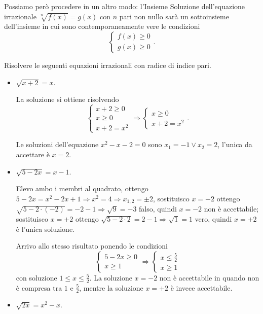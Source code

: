 Possiamo però procedere in un altro modo: l’Insieme Soluzione dell’equazione irrazionale $\sqrt[n]{f(x)}=g(x)$ con $ n $ pari non nullo sarà un sottoinsieme dell’insieme in cui sono contemporaneamente vere le condizioni 
\[\left\{\begin{array}{l}{f(x)\ge 0}\\{g(x)\ge 0}\end{array}\right..\]

\begin{exrig}
\begin{esempio}
Risolvere le seguenti equazioni irrazionali con radice di indice pari.
\begin{itemize}
\item $ \sqrt{x+2}=x $.

La soluzione si ottiene risolvendo 
\[\left\{\begin{array}{l}x+2\ge 0 \\x\ge 0\\x+2=x^2 \end{array}\right.\Rightarrow \left\{\begin{array}{l}x\ge 0\\x+2=x^2 \end{array}\right..\]

Le soluzioni dell'equazione $x^2-x-2=0$ sono $x_1=-1\vee x_2=2$, l'unica da accettare è $x=2$.

\item $ \sqrt{5-2x}=x-1 $.

Elevo ambo i membri al quadrato, ottengo $5-2x=x^2-2x+1 \Rightarrow x^2=4 \Rightarrow x_{1,2}=\pm 2$,
sostituisco $x=-2$ ottengo $\sqrt{5-2\cdot (-2)}=-2-1 \Rightarrow \sqrt 9=-3$ falso, quindi $x=-2$ non è accettabile;
sostituisco $x=+2$ ottengo $\sqrt{5-2\cdot 2}=2-1 \Rightarrow \sqrt 1=1$ vero, quindi $x=+2$ è l'unica soluzione.

Arrivo allo stesso risultato ponendo le condizioni 
\[\left\{\begin{array}{l}5-2x\ge 0 \\x\ge 1\end{array}\right.\Rightarrow \left\{\begin{array}{l}x\le \frac 5 2\\x\ge 1\end{array}\right.\]
 con soluzione $1\le x\le \frac 5 2$. La soluzione $x=-2$ non è accettabile in quando non è compresa tra $1$ e $\frac 5 2$, mentre la soluzione $x=+2$ è invece accettabile.

\item $ \sqrt{2x}=x^2-x $.


\end{itemize}
\end{esempio}
\end{exrig}
